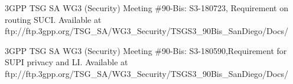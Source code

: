 \documentclass[conference]{IEEEtran}
\begin{document}
\begin{thebibliography}{6}
 3GPP TSG SA WG3 (Security) Meeting \#90-Bis: S3-180723, Requirement on routing SUCI. Available at
ftp://ftp.3gpp.org/TSG\_SA/WG3\_Security/TSGS3\_90Bis\_SanDiego/Docs/

 3GPP TSG SA WG3 (Security) Meeting \#90-Bis: S3-180590,Requirement for SUPI privacy and LI. Available at 
ftp://ftp.3gpp.org/TSG\_SA/WG3\_Security/TSGS3\_90Bis\_SanDiego/Docs/







\end{thebibliography}
\end{document}
